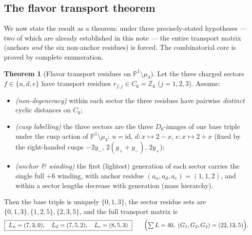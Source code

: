 \documentclass[11pt,a4paper]{article}
\theoremstyle{definition}
\newtheorem{theorem}{Theorem}
\begin{document}
\subsection{The flavor transport theorem}
We now state the result as a theorem: under three precisely-stated hypotheses --- two of which are
already established in this note --- the entire transport matrix (anchors \emph{and} the six non-anchor
residues) is forced. The combinatorial core is proved by complete enumeration.

\begin{theorem}[Flavor transport residues on $\mathbb P^1\setminus\mu_4$]
\label{thm:flavor}
Let the three charged sectors $f\in\{u,d,e\}$ have transport residues $r_{f,j}\in C_6=\mathbb Z_6$
($j=1,2,3$). Assume:
\begin{itemize}[leftmargin=1.6em]
\item[\textbf{(H1)}] \emph{(non-degeneracy)} within each sector the three residues have pairwise
\emph{distinct} cyclic distances on $C_6$;
\item[\textbf{(H2)}] \emph{(cusp labelling)} the three sectors are the three $D_6$-images of one base
triple under the cusp action of $\mathbb P^1\setminus\mu_4$: $u=\mathrm{id}$, $d:x\mapsto 2{-}x$,
$e:x\mapsto 2{+}x$ (fixed by the right-handed cusps $-2y_-,\,2(y_+{+}y_-),\,2y_+$);
\item[\textbf{(H3)}] \emph{(anchor \& winding)} the first (lightest) generation of each sector carries
the single full $+6$ winding, with anchor residue $(a_u,a_d,a_e)=(1,1,2)$, and within a sector lengths
decrease with generation (mass hierarchy).
\end{itemize}
Then the base triple is uniquely $\{0,1,3\}$, the sector residue sets are
$\{0,1,3\},\{1,2,5\},\{2,3,5\}$, and the full transport matrix is
\begin{equation}
  \boxed{\ L_u=(7,3,0),\quad L_d=(7,5,2),\quad L_e=(8,5,3)\ }\qquad
  \Bigl(\textstyle\sum L=40,\ (G_1,G_2,G_3)=(22,13,5)\Bigr).
\end{equation}
\end{theorem}
\end{document}
